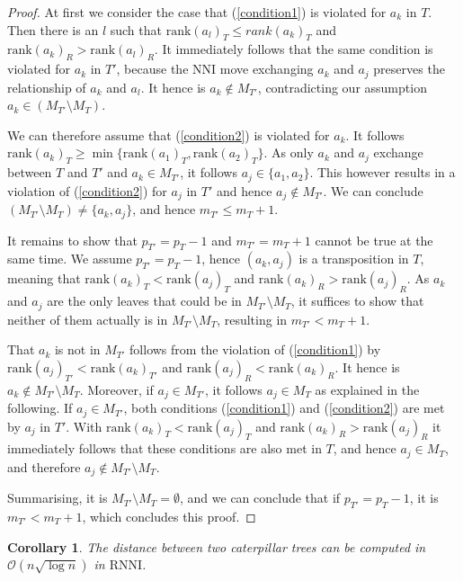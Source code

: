 \documentclass[11pt]{amsart}
\newtheorem{corollary}{Corollary}
\newcommand{\rnni}{\mathrm{RNNI}}
\newcommand{\rank}{\mathrm{rank}}
\newcommand{\nni}{\mathrm{NNI}}
\renewcommand{\O}{\mathcal O}
\begin{document}
\begin{proof}
	At first we consider the case that (\ref{condition1}) is violated for $a_k$ in $T$.
	Then there is an $l$ such that $\rank(a_l)_T \leq rank(a_k)_T$ and $\rank(a_k)_R > \rank(a_l)_R$.
	It immediately follows that the same condition is violated for $a_k$ in $T'$, because the $\nni$ move exchanging $a_k$ and $a_j$ preserves the relationship of $a_k$ and $a_l$.
	It hence is $a_k \notin M_{T'}$, contradicting our assumption $a_k \in (M_{T'} \setminus M_T)$.

	We can therefore assume that (\ref{condition2}) is violated for $a_k$.
	It follows $\rank(a_k)_T \geq \min\{\rank(a_1)_T, \rank(a_2)_T\}$.
	As only $a_k$ and $a_j$ exchange between $T$ and $T'$ and $a_k \in M_{T'}$, it follows $a_j \in \{a_1, a_2\}$.
	This however results in a violation of (\ref{condition2}) for $a_j$ in $T'$ and hence $a_j \notin M_{T'}$.
	We can conclude $(M_{T'} \setminus M_T) \neq \{a_k, a_j\}$, and hence $m_{T'} \leq m_T + 1$.

	It remains to show that $p_{T'} = p_T - 1$ and $m_{T'} = m_T + 1$ cannot be true at the same time.
	We assume $p_{T'} = p_T - 1$, hence $(a_k,a_j)$ is a transposition in $T$, meaning that $\rank(a_k)_T < \rank(a_j)_T$ and $\rank(a_k)_R > \rank(a_j)_R$.
	As $a_k$ and $a_j$ are the only leaves that could be in $M_{T'} \setminus M_T$, it suffices to show that neither of them actually is in $M_{T'} \setminus M_T$, resulting in $m_{T'} < m_T + 1$.

	That $a_k$ is not in $M_{T'}$ follows from the violation of (\ref{condition1}) by $\rank(a_j)_{T'} < \rank(a_k)_{T'}$ and $\rank(a_j)_R < \rank(a_k)_R$.
	It hence is $a_k \notin M_{T'} \setminus M_T$.
	Moreover, if $a_j \in M_{T'}$, it follows $a_j \in M_T$ as explained in the following.
	If $a_j \in M_{T'}$, both conditions (\ref{condition1}) and (\ref{condition2}) are met by $a_j$ in $T'$.
	With $\rank(a_k)_T < \rank(a_j)_T$ and $\rank(a_k)_R > \rank(a_j)_R$ it immediately follows that these conditions are also met in $T$, and hence $a_j \in M_T$, and therefore $a_j \notin M_{T'} \setminus M_T$.

	Summarising, it is $M_{T'} \setminus M_T = \emptyset$, and we can conclude that if $p_{T'} = p_T - 1$, it is $m_{T'} < m_T + 1$, which concludes this proof.
\end{proof}

\begin{corollary}
	The distance between two caterpillar trees can be computed in $\O(n \sqrt{\log n})$ in $\rnni$.
	\label{cor:caterpillar_distance_rnni_nlogn}
\end{corollary}
\vspace{-0.66cm}
\end{document}
